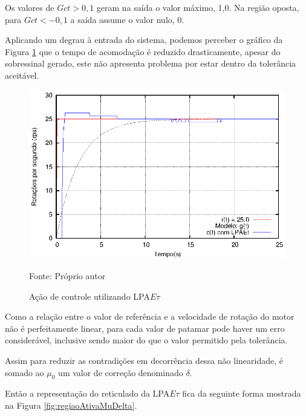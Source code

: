 Os valores de $Gct > 0,1$ geram na saída o valor máximo,
1,0. Na região oposta, para $Gct < -0,1$ a saída assume
 o valor nulo, 0. 

Aplicando um degrau à entrada do sistema, 
podemos perceber o gráfico da 
Figura \ref{fig:acaoLPAEtgct100} 
que o tempo de acomodação é reduzido drasticamente, 
apesar do sobressinal gerado, 
este não apresenta problema por estar 
dentro da tolerância aceitável. 


\begin{figure}[!htb]
\caption{Ação de controle utilizando LPA$E\tau$}
\vspace{-1cm}\center\includegraphics[scale=1.6]{./imagens/LPAEt-gct100.eps}
\label{fig:acaoLPAEtgct100}

{\small Fonte: Próprio autor}
\end{figure}

Como a relação entre o valor de referência e a 
velocidade de rotação do motor não é perfeitamente linear,
para cada valor de patamar pode haver um erro considerável,
inclusive sendo maior do que o valor permitido pela 
tolerância. 

Assim para reduzir as contradições 
em decorrência dessa não linearidade, 
é somado ao $\mu_0$ um valor de correção denominado $\delta$.

Então a representação do reticulado da LPA$E\tau$ 
fica da seguinte forma mostrada na 
Figura \ref{fig:regiaoAtivaMuDelta}. 


